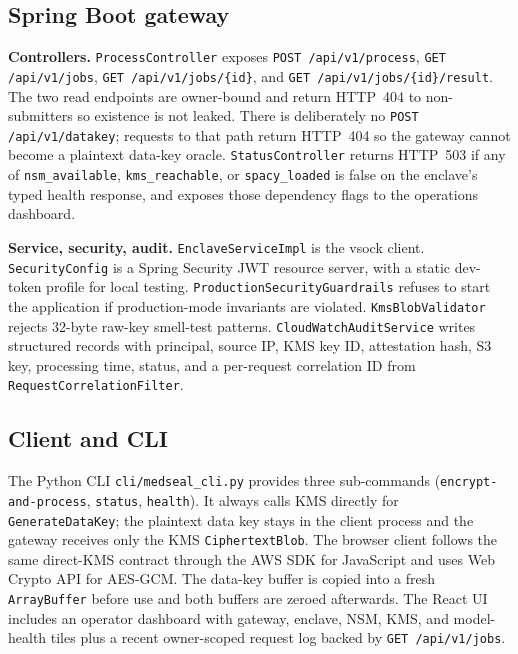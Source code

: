 \documentclass[11pt]{article}
\begin{document}
\subsection{Spring Boot gateway}

\textbf{Controllers.}
\texttt{ProcessController} exposes
\texttt{POST /api/v1/process},
\texttt{GET /api/v1/jobs},
\texttt{GET /api/v1/jobs/\{id\}}, and
\texttt{GET /api/v1/jobs/\{id\}/result}. The two read endpoints
are owner-bound and return HTTP~404 to non-submitters so existence
is not leaked. There is deliberately no
\texttt{POST /api/v1/datakey}; requests to that path return
HTTP~404 so the gateway cannot become a plaintext data-key oracle.
\texttt{StatusController} returns HTTP~503 if any of
\texttt{nsm\_available}, \texttt{kms\_reachable}, or
\texttt{spacy\_loaded} is false on the enclave's typed health
response, and exposes those dependency flags to the operations
dashboard.

\textbf{Service, security, audit.}
\texttt{EnclaveServiceImpl} is the vsock client.
\texttt{SecurityConfig} is a Spring Security \cite{springsec} JWT
resource server, with a static dev-token profile for local
testing. \texttt{ProductionSecurityGuardrails} refuses to start
the application if production-mode invariants are violated.
\texttt{KmsBlobValidator} rejects 32-byte raw-key smell-test
patterns. \texttt{CloudWatchAuditService} writes structured
records with principal, source IP, KMS key ID, attestation hash,
S3 key, processing time, status, and a per-request correlation ID
from \texttt{RequestCorrelationFilter}.

\subsection{Client and CLI}

The Python CLI \texttt{cli/medseal\_cli.py} provides three
sub-commands (\texttt{encrypt-and-process}, \texttt{status},
\texttt{health}). It always calls KMS directly for
\texttt{GenerateDataKey}; the plaintext data key stays in the client
process and the gateway receives only the KMS \texttt{CiphertextBlob}.
The browser client follows the same direct-KMS contract through the
AWS SDK for JavaScript and uses Web Crypto API for AES-GCM. The
data-key buffer is copied into a fresh \texttt{ArrayBuffer} before
use and both buffers are zeroed afterwards. The React UI includes an
operator dashboard with gateway, enclave, NSM, KMS, and model-health
tiles plus a recent owner-scoped request log backed by
\texttt{GET /api/v1/jobs}.
\end{document}
